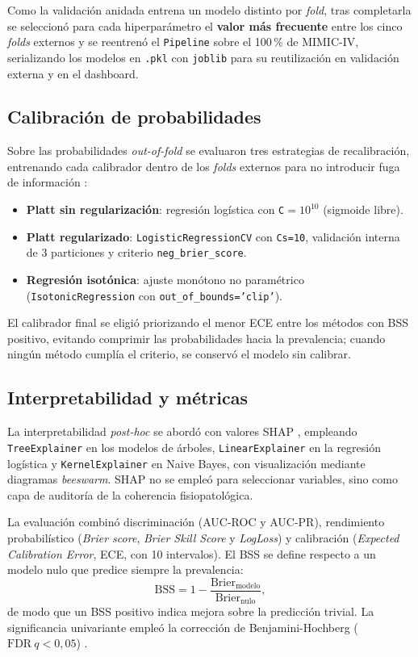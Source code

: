 \documentclass[
  spanish,
  a4paper,
  12pt,
  twoside]{memoir}
\begin{document}
Como la validación anidada entrena un modelo distinto por \emph{fold}, tras completarla se seleccionó para cada hiperparámetro el \textbf{valor más
frecuente} entre los cinco \emph{folds} externos y se reentrenó el \texttt{Pipeline} sobre el 100\,\% de MIMIC-IV, serializando los modelos en
\texttt{.pkl} con \texttt{joblib} para su reutilización en validación externa y en el dashboard.

\subsection*{Calibración de probabilidades}

Sobre las probabilidades \textit{out-of-fold} se evaluaron tres estrategias de recalibración, entrenando cada calibrador dentro de los \emph{folds} externos para no introducir fuga de información \cite{kamran2024}:

\begin{itemize}
  \item \textbf{Platt sin regularización}: regresión logística con \texttt{C}$=10^{10}$ (sigmoide libre).
  \item \textbf{Platt regularizado}: \texttt{LogisticRegressionCV} con \texttt{Cs=10}, validación interna de 3 particiones y criterio \texttt{neg\_brier\_score}.
  \item \textbf{Regresión isotónica}: ajuste monótono no paramétrico (\texttt{IsotonicRegression} con \texttt{out\_of\_bounds='clip'}).
\end{itemize}

El calibrador final se eligió priorizando el menor ECE entre los métodos con BSS positivo, evitando comprimir las probabilidades hacia la prevalencia;
cuando ningún método cumplía el criterio, se conservó el modelo sin calibrar.

\subsection*{Interpretabilidad y métricas}

La interpretabilidad \emph{post-hoc} se abordó con valores SHAP \cite{lundberg2017}, empleando \texttt{TreeExplainer} en los modelos de
árboles, \texttt{LinearExplainer} en la regresión logística y \texttt{KernelExplainer} en Naive Bayes, con visualización mediante diagramas
\textit{beeswarm}. SHAP no se empleó para seleccionar variables, sino como capa de auditoría de la coherencia fisiopatológica.

La evaluación combinó discriminación (AUC-ROC y AUC-PR), rendimiento probabilístico (\textit{Brier score}, \textit{Brier Skill Score} y
\textit{LogLoss}) y calibración (\textit{Expected Calibration Error}, ECE, con 10 intervalos). El BSS se define respecto a un modelo nulo que predice siempre
la prevalencia:
\[
  \mathrm{BSS} = 1 - \frac{\mathrm{Brier}_{\text{modelo}}}{\mathrm{Brier}_{\text{nulo}}},
\]
de modo que un BSS positivo indica mejora sobre la predicción trivial. La
significancia univariante empleó la corrección de Benjamini-Hochberg
($\mathrm{FDR}\ q<0{,}05$) \cite{benjamini1995}.
\end{document}
